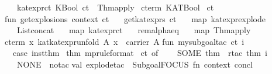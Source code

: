 \begin{isabellebody}
\ \ {}\ kat{}expr{}ct\ {}KBool\ ct{}\ {}\ Thm{}apply\ %
\isaantiq
cterm\ KATBool{}%
\endisaantiq
\ ct\isanewline
\isanewline
fun\ get{}explosions\ context\ ct\ {}\isanewline
\ \ get{}kat{}exprs\ ct\isanewline
\ \ {}{}\ map\ kat{}expr{}explode\isanewline
\ \ {}{}\ List{}concat\isanewline
\ \ {}{}\ map\ kat{}expr{}ct\isanewline
\ \ {}{}\ rem{}alpha{}eq\isanewline
\ \ {}{}\ map\ {}Thm{}apply\ %
\isaantiq
cterm\ {}{}x{}\ kat{}kat{}expr{}unfold\ A\ x\ {}\ carrier\ A{}{}%
\endisaantiq
{}\isanewline
\isanewline
fun\ my{}subgoal{}tac\ ct\ i\ {}\isanewline
\ \ case\ inst{}thm\ %
\isaantiq
thm\ mp{}rule{}format{}{}%
\endisaantiq
\ ct\ of\isanewline
\ \ \ \ SOME\ thm\ {}{}\ rtac\ thm\ i\isanewline
\ \ {}\ NONE\ {}{}\ no{}tac\isanewline
\isanewline
val\ explode{}tac\ {}\ Subgoal{}FOCUS\ {}fn\ {}context{}\ concl{}\ {}{}{}{}\ {}{}\isanewline

\end{isabellebody}
